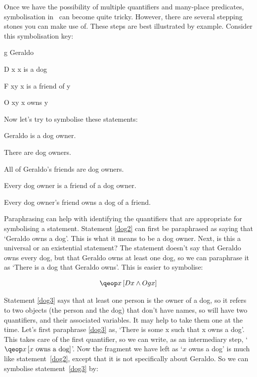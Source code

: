 \documentclass[PHIL101-Textbook.tex]{subfiles}
\begin{document}
\begin{center}
  \href{https://youtu.be/YzbYDM11Ut0}
  {}
\end{center}

Once we have the possibility of multiple quantifiers and many-place predicates, symbolisation in \pl\ can become quite tricky. However, there are several stepping stones you can make use of. These steps are best illustrated by example. Consider this symbolisation key:
\begin{ekey}
\item[g] Geraldo
\item[\atom D x ] x is a dog
\item[\atom F xy ] x is a friend of y
\item[\atom O xy ] x owns y
\end{ekey}
Now let's try to symbolise these statements:
\begin{earg}
\item[\ex{dog2}] Geraldo is a dog owner.
\item[\ex{dog3}] There are dog owners.
\item[\ex{dog4}] All of Geraldo's friends are dog owners.
\item[\ex{dog5}] Every dog owner is a friend of a dog owner.
\item[\ex{dog6}] Every dog owner's friend owns a dog of a friend.
\end{earg}

\noindent Paraphrasing can help with identifying the quantifiers that are appropriate for symbolising a statement.
Statement \ref{dog2} can first be paraphrased as saying that `Geraldo owns a dog'.
This is what it means to be a dog owner.
Next, is this a universal or an existential statement?
The statement doesn't say that Geraldo owns every dog, but that Geraldo owns at least one dog, so we can paraphrase it as `There is a dog that Geraldo owns'.
This is easier to symbolise: 

$$\qeb{x}{\atom D x  \eand \atom O gx}$$

\noindent Statement \ref{dog3} says that at least one person is the owner of a dog, so it refers to two objects (the person and the dog) that don't have names, so will have two quantifiers, and their associated variables.
It may help to take them one at the time.
Let's first paraphrase \ref{dog3} as, `There is some x such that x owns a dog'.
This takes care of the first quantifier, so we can write, as an intermediary step, `$\qeb{x}{x\text{ owns a dog}}$'.
Now the fragment we have left as `$x$ owns a dog' is much like statement~\ref{dog2}, except that it is not specifically about Geraldo.
So we can symbolise statement~\ref{dog3} by:
\end{document}

